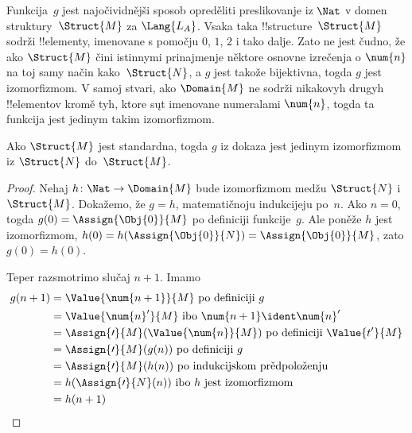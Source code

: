 \documentclass[../../../include/open-logic-section]{subfiles}
\begin{document}
\begin{explain}
Funkcija~$g$ jest najočividnějši sposob opreděliti preslikovanje iz
$\Nat$ v domen struktury~$\Struct{M}$ za $\Lang{L_A}$. Vsaka taka
!!{structure}~$\Struct{M}$ sodrži !!{element}y, imenovane s pomočju $\num{0}$,
$\num{1}$, $\num{2}$ i tako dalje. Zato ne jest čudno, že ako
$\Struct{M}$ čini istinnymi prinajmenje něktore osnovne izrečenja o
$\num{n}$ na toj samy način kako~$\Struct{N}$, a $g$ jest takože
bijektivna, togda $g$ jest izomorfizmom. V samoj stvari, ako
$\Domain{M}$ ne sodrži nikakovyh drugyh !!{element}ov kromě tyh, ktore
sųt imenovane numeralami $\num{n}$, togda ta funkcija jest jedinym
takim izomorfizmom.
\end{explain}

\begin{prop}
 Ako $\Struct{M}$ jest standardna, togda
$g$ iz dokaza  jest jedinym izomorfizmom iz
$\Struct{N}$ do~$\Struct{M}$.
\end{prop}

\begin{proof}
Nehaj $h\colon \Nat \to \Domain{M}$ bude izomorfizmom medžu
$\Struct{N}$ i~$\Struct{M}$. Dokažemo, že $g = h$, matematičnoju
indukcijeju po~$n$. Ako $n = 0$, togda $g(0) = \Assign{\Obj{0}}{M}$ po definiciji
funkcije~$g$. Ale poněže $h$ jest izomorfizmom, $h(0) =
h(\Assign{\Obj{0}}{N}) =\Assign{\Obj{0}}{M}$, zato $g(0) = h(0)$.

Teper razsmotrimo slučaj $n+1$. Imamo
\begin{align*}
  g(n+1) & = \Value{\num{n+1}}{M} \text{ po definiciji~$g$}\\
  & = \Value{\num{n}'}{M} \text{ ibo $\num{n+1}\ident \num{n}'$}\\
  & = \Assign{\prime}{M}(\Value{\num{n}}{M})
    \text{ po definiciji $\Value{t'}{M}$}\\
  & = \Assign{\prime}{M}(g(n)) \text{ po definiciji~$g$}\\
  & = \Assign{\prime}{M}(h(n)) \text{ po indukcijskom prědpoloženju}\\
  & = h(\Assign{\prime}{N}(n)) \text{ ibo $h$ jest izomorfizmom}\\
  & = h(n+1)
\end{align*}
\end{proof}
\end{document}
